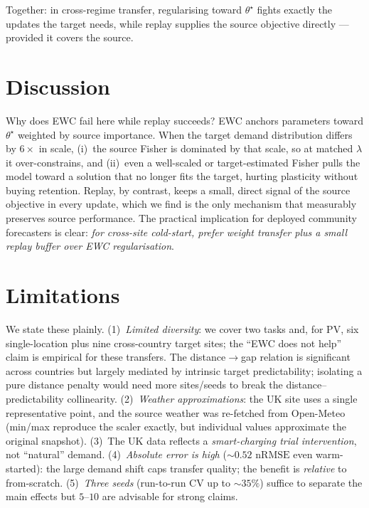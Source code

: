 \documentclass[conference]{IEEEtran}
\newcommand{\nrmse}{\mathrm{nRMSE}}
\begin{document}
\noindent Together: in cross-regime transfer, regularising toward $\theta^{\star}$
fights exactly the updates the target needs, while replay supplies the source
objective directly --- provided it covers the source.

\section{Discussion}
Why does EWC fail here while replay succeeds? EWC anchors parameters toward
$\theta^{\star}$ weighted by source importance. When the target demand
distribution differs by $6\times$ in scale, (i)~the source Fisher is dominated by
that scale, so at matched $\lambda$ it over-constrains, and (ii)~even a
well-scaled or target-estimated Fisher pulls the model toward a solution that no
longer fits the target, hurting plasticity without buying retention. Replay, by
contrast, keeps a small, direct signal of the source objective in every update,
which we find is the only mechanism that measurably preserves source performance.
The practical implication for deployed community forecasters is clear:
\emph{for cross-site cold-start, prefer weight transfer plus a small replay buffer
over EWC regularisation}.

\section{Limitations}
We state these plainly. (1)~\emph{Limited diversity}: we cover two tasks and,
for PV, six single-location plus nine cross-country target sites; the ``EWC does
not help'' claim is empirical for these transfers. The distance$\rightarrow$gap
relation is significant across countries but largely mediated by intrinsic target
predictability; isolating a pure distance penalty would need more sites/seeds to
break the distance--predictability collinearity. (2)~\emph{Weather approximations}: the UK site
uses a single representative point, and the source weather was re-fetched from
Open-Meteo (min/max reproduce the scaler exactly, but individual values
approximate the original snapshot). (3)~The UK data reflects a \emph{smart-charging
trial intervention}, not ``natural'' demand. (4)~\emph{Absolute error is high}
(${\sim}0.52$ $\nrmse$ even warm-started): the large demand shift caps transfer
quality; the benefit is \emph{relative} to from-scratch. (5)~\emph{Three seeds}
(run-to-run CV up to ${\sim}35\%$) suffice to separate the main effects but $5$--$10$
are advisable for strong claims.
\end{document}

